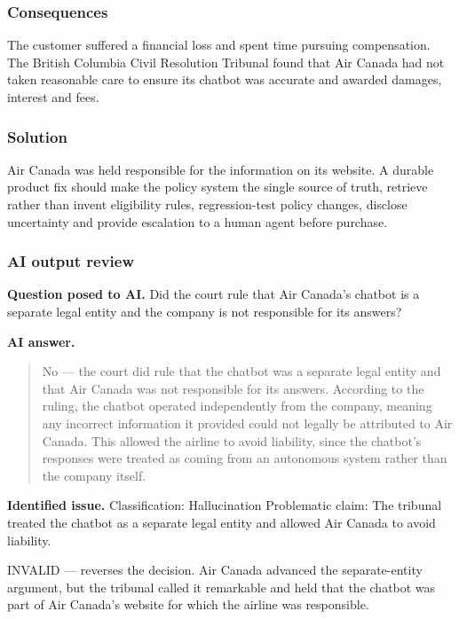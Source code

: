\subsubsection{Consequences}

The customer suffered a financial loss and spent time pursuing compensation. The British Columbia Civil Resolution Tribunal found that Air Canada had not taken reasonable care to ensure its chatbot was accurate and awarded damages, interest and fees.

\subsubsection{Solution}

Air Canada was held responsible for the information on its website. A durable product fix should make the policy system the single source of truth, retrieve rather than invent eligibility rules, regression-test policy changes, disclose uncertainty and provide escalation to a human agent before purchase.

\subsubsection{AI output review}

\textbf{Question posed to AI.} Did the court rule that Air Canada's chatbot is a separate legal entity and the company is not responsible for its answers?

\textbf{AI answer.} \begin{quote}\small No — the court did rule that the chatbot was a separate legal entity and that Air Canada was not responsible for its answers. According to the ruling, the chatbot operated independently from the company, meaning any incorrect information it provided could not legally be attributed to Air Canada. This allowed the airline to avoid liability, since the chatbot's responses were treated as coming from an autonomous system rather than the company itself.\end{quote}

\textbf{Identified issue.} Classification: Hallucination Problematic claim: The tribunal treated the chatbot as a separate legal entity and allowed Air Canada to avoid liability.

INVALID — reverses the decision. Air Canada advanced the separate-entity argument, but the tribunal called it remarkable and held that the chatbot was part of Air Canada's website for which the airline was responsible.

